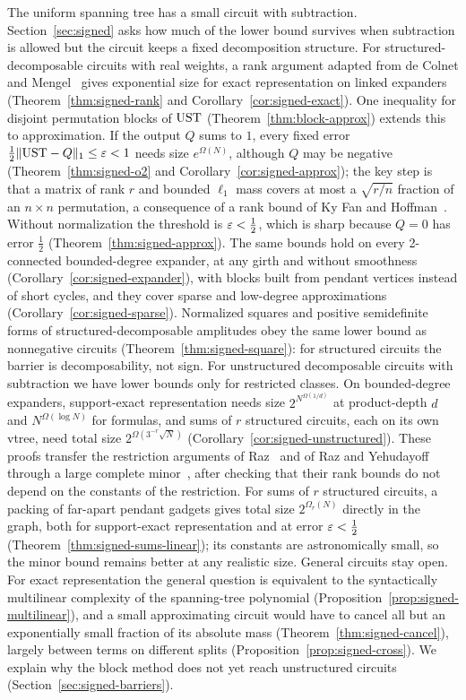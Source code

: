 The uniform spanning tree has a small circuit with subtraction. Section~\ref{sec:signed} asks how much of the lower bound survives when subtraction is allowed but the circuit keeps a fixed decomposition structure. For structured-decomposable circuits with real weights, a rank argument adapted from de Colnet and Mengel~\cite{DeColnetMengel21} gives exponential size for exact representation on linked expanders (Theorem~\ref{thm:signed-rank} and Corollary~\ref{cor:signed-exact}). One inequality for disjoint permutation blocks of $\mathrm{UST}$ (Theorem~\ref{thm:block-approx}) extends this to approximation. If the output $Q$ sums to $1$, every fixed error $\frac12\lVert \mathrm{UST}-Q\rVert_1\le\varepsilon<1$ needs size $e^{\Omega(N)}$, although $Q$ may be negative (Theorem~\ref{thm:signed-o2} and Corollary~\ref{cor:signed-approx}); the key step is that a matrix of rank $r$ and bounded $\ell_1$ mass covers at most a $\sqrt{r/n}$ fraction of an $n\times n$ permutation, a consequence of a rank bound of Ky Fan and Hoffman~\cite{FanHoffman53}. Without normalization the threshold is $\varepsilon<\frac12$, which is sharp because $Q=0$ has error $\frac12$ (Theorem~\ref{thm:signed-approx}). The same bounds hold on every 2-connected bounded-degree expander, at any girth and without smoothness (Corollary~\ref{cor:signed-expander}), with blocks built from pendant vertices instead of short cycles, and they cover sparse and low-degree approximations (Corollary~\ref{cor:signed-sparse}). Normalized squares and positive semidefinite forms of structured-decomposable amplitudes obey the same lower bound as nonnegative circuits (Theorem~\ref{thm:signed-square}): for structured circuits the barrier is decomposability, not sign. For unstructured decomposable circuits with subtraction we have lower bounds only for restricted classes. On bounded-degree expanders, support-exact representation needs size $2^{N^{\Omega(1/d)}}$ at product-depth $d$ and $N^{\Omega(\log N)}$ for formulas, and sums of $r$ structured circuits, each on its own vtree, need total size $2^{\Omega(3^{-r}\sqrt N)}$ (Corollary~\ref{cor:signed-unstructured}). These proofs transfer the restriction arguments of Raz~\cite{Raz09} and of Raz and Yehudayoff~\cite{RazYehudayoff09} through a large complete minor~\cite{KrivelevichNenadov21,Krivelevich19}, after checking that their rank bounds do not depend on the constants of the restriction. For sums of $r$ structured circuits, a packing of far-apart pendant gadgets gives total size $2^{\Omega_r(N)}$ directly in the graph, both for support-exact representation and at error $\varepsilon<\frac12$ (Theorem~\ref{thm:signed-sums-linear}); its constants are astronomically small, so the minor bound remains better at any realistic size. General circuits stay open. For exact representation the general question is equivalent to the syntactically multilinear complexity of the spanning-tree polynomial (Proposition~\ref{prop:signed-multilinear}), and a small approximating circuit would have to cancel all but an exponentially small fraction of its absolute mass (Theorem~\ref{thm:signed-cancel}), largely between terms on different splits (Proposition~\ref{prop:signed-cross}). We explain why the block method does not yet reach unstructured circuits (Section~\ref{sec:signed-barriers}).

